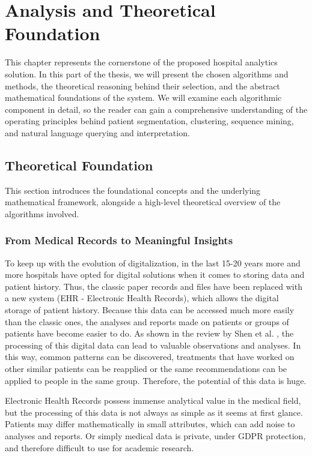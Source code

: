 \chapter{Analysis and Theoretical Foundation}
\label{ch:analysis}
\pagestyle{fancy}

This chapter represents the cornerstone of the proposed hospital analytics solution. In this part of the thesis, we will present the chosen algorithms and methods, the theoretical reasoning behind their selection, and the abstract mathematical foundations of the system. We will examine each algorithmic component in detail, so the reader can gain a comprehensive understanding of the operating principles behind patient segmentation, clustering, sequence mining, and natural language querying and interpretation.

\section{Theoretical Foundation}

This section introduces the foundational concepts and the underlying mathematical framework, alongside a high-level theoretical overview of the algorithms involved.

\subsection{From Medical Records to Meaningful Insights}

To keep up with the evolution of digitalization, in the last 15-20 years more and more hospitals have opted for digital solutions when it comes to storing data and patient history. Thus, the classic paper records and files have been replaced with a new system (EHR - Electronic Health Records), which allows the digital storage of patient history. Because this data can be accessed much more easily than the classic ones, the analyses and reports made on patients or groups of patients have become easier to do. As shown in the review by Shen et al. \cite{shen2025}, the processing of this digital data can lead to valuable observations and analyses. In this way, common patterns can be discovered, treatments that have worked on other similar patients can be reapplied or the same recommendations can be applied to people in the same group. Therefore, the potential of this data is huge.

Electronic Health Records possess immense analytical value in the medical field, but the processing of this data is not always as simple as it seems at first glance. Patients may differ mathematically in small attributes, which can add noise to analyses and reports. Or simply medical data is private, under GDPR protection, and therefore difficult to use for academic research.

